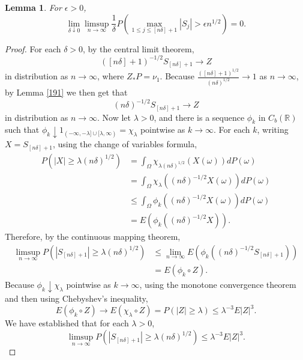 \documentclass{article}
\newtheorem{lemma}[theorem]{Lemma}
\theoremstyle{definition}
\begin{document}
\begin{lemma}
For $\epsilon>0$,
\[
\lim_{\delta \downarrow 0} \limsup_{n \to \infty} \frac{1}{\delta} P\left(\max_{1 \leq j \leq [n\delta]+1} |S_j| > \epsilon n^{1/2} \right)=0.
\]
\label{lemma418}
\end{lemma}
\begin{proof}
For each $\delta>0$, by the central limit theorem,
\[
([n\delta]+1)^{-1/2} S_{[n\delta]+1} \to Z
\]
in distribution as $n \to \infty$, where $Z_*P=\nu_1$.  Because $\frac{([n\delta]+1)^{1/2}}{(n\delta)^{1/2}} \to 1$ as $n \to \infty$, by Lemma \ref{191} we then
get that
\[
(n\delta)^{-1/2} S_{[n\delta]+1} \to Z
\]
in distribution as $n \to \infty$.
Now let $\lambda>0$, and there is a sequence $\phi_k$ in $C_b(\mathbb{R})$ such that
$\phi_k \downarrow 1_{(-\infty,-\lambda] \cup [\lambda,\infty)}=\chi_\lambda$ pointwise as $k \to \infty$. 
For each $k$, writing $X=S_{[n\delta]+1}$, using the change of variables formula,
\begin{align*}
P(|X| \geq \lambda (n\delta)^{1/2})
&=
\int_\Omega 
 \chi_{\lambda (n\delta)^{1/2}}(X(\omega)) dP(\omega)\\
 & = 
\int_\Omega \chi_{\lambda}((n\delta)^{-1/2} X(\omega)) dP(\omega)\\
&\leq \int_\Omega \phi_k((n\delta)^{-1/2} X(\omega)) dP(\omega)\\
&=E(\phi_k((n\delta)^{-1/2}X)).
\end{align*}
Therefore, by the continuous mapping theorem,
\begin{align*}
\limsup_{n \to \infty} P(|S_{[n\delta]+1}| \geq \lambda (n\delta)^{1/2})&\leq \lim_{n \to \infty} E(\phi_k((n\delta)^{-1/2}S_{[n\delta]+1}))\\
&=E(\phi_k \circ Z).
\end{align*}
Because $\phi_k \downarrow \chi_\lambda$ pointwise as $k \to \infty$, using the monotone convergence theorem and then using Chebyshev's inequality,
\[
E(\phi_k \circ Z) \to E(\chi_\lambda \circ Z) =  P(|Z| \geq \lambda) \leq \lambda^{-3} E|Z|^3.
\]
We have established that for each $\lambda>0$,
\begin{equation}
\limsup_{n \to \infty} P(|S_{[n\delta]+1}| \geq \lambda (n\delta)^{1/2}) \leq  \lambda^{-3} E|Z|^3.
\label{412}
\end{equation}


\end{proof}
\end{document}
